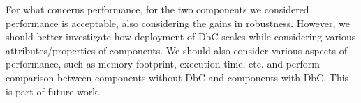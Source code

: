 For what concerns performance, for the two components we considered %
performance is acceptable, also considering the gains in robustness. However, we should better investigate how deployment of DbC scales while considering various attributes/properties of components. We should also consider various aspects of performance, such as %
memory footprint, execution time, etc. and perform comparison between components without DbC and components with DbC. This is part of future work. %
